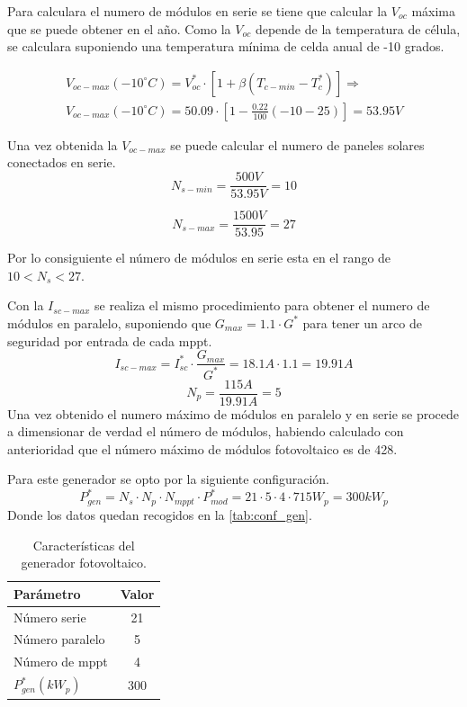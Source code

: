 \documentclass[12pt]{article}
\begin{document}
Para calculara el numero de módulos en serie se tiene que calcular la $V_{oc}$ máxima que se puede obtener en el año. Como la $V_{oc}$ depende de la temperatura de célula, se calculara suponiendo una temperatura mínima de celda anual de -10 grados.

\begin{align}
	V_{oc-max}(-10^\circ C)=V^*_{oc}\cdot[1+\beta(T_{c-min}-T_c^*)]\Longrightarrow 	\\
	V_{oc-max}(-10^\circ C)=50.09\cdot[1-\frac{0.22}{100} (-10-25)]=53.95V
\end{align}

Una vez obtenida la $V_{oc-max}$ se puede calcular el numero de paneles solares conectados en serie.
\begin{equation}
	N_{s-min}=\frac{500V}{53.95V}=10
\end{equation}

\begin{equation}
	N_{s-max}=\frac{1500V}{53.95}=27
\end{equation}

Por lo consiguiente el número de módulos en serie esta en el rango de $10<N_s<27$.

Con la $I_{sc-max}$ se realiza el mismo procedimiento para obtener el numero de módulos en paralelo, suponiendo que $G_{max}=1.1\cdot G^*$ para tener un arco de seguridad por entrada de cada mppt.
\begin{equation}
	I_{sc-max}=I^*_{sc}\cdot \frac{G_{max}}{G^*}=18.1A\cdot 1.1=19.91A
\end{equation}
\begin{equation}
	N_p=\frac{115A}{19.91A}=5
\end{equation}
Una vez obtenido el numero máximo de módulos en paralelo y en serie se procede a dimensionar de verdad el número de módulos, habiendo calculado con anterioridad que el número máximo de módulos fotovoltaico es de 428.

Para este generador se opto por la siguiente configuración.
\begin{equation}
	P^*_{gen}=N_s\cdot N_p \cdot N_{mppt} \cdot P^*_{mod}= 21 \cdot 5 \cdot 4 \cdot 715W_p=300kW_p
\end{equation}
Donde los datos quedan recogidos en la \autoref{tab:conf_gen}.
\begin{table}[h]
	\centering
	\caption{Características del generador fotovoltaico.}
	\label{tab:conf_gen}
	\begin{tabular}{l c}
		\toprule
		\textbf{Parámetro} & \textbf{Valor} \\
		\midrule
		Número serie & 21 \\
		Número paralelo & 5 \\
		Número de mppt &4 \\
		$P^*_{gen}(kW_p)$ & 300 \\
		\bottomrule
	\end{tabular}
\end{table}
\end{document}

